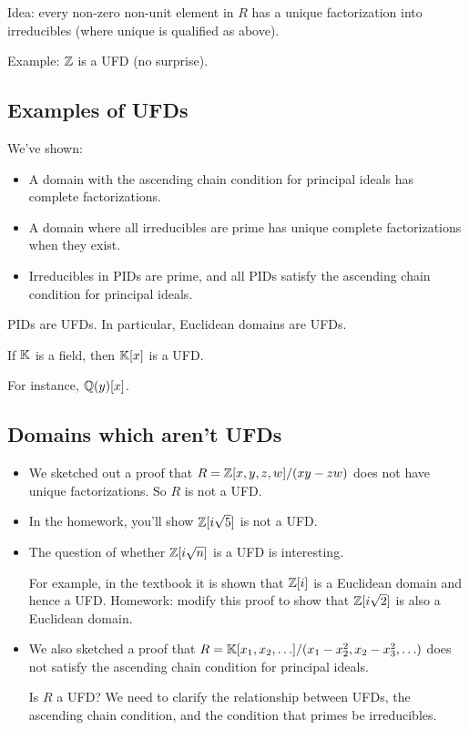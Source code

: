 \documentclass[12pt,letterpaper]{report}
\begin{document}
Idea: every non-zero non-unit element in $R$ has a unique factorization into irreducibles (where
unique is qualified as above).

Example: $\mathbb{Z}$ is a UFD (no surprise).

\pagebreak
\subsection{Examples of UFDs}

We've shown:
\begin{itemize}
  \item A domain with the ascending chain condition for principal ideals has complete
    factorizations.
  \item A domain where all irreducibles are prime has unique complete factorizations when they
    exist.
  \item Irreducibles in PIDs are prime, and all PIDs satisfy the ascending chain condition for
    principal ideals.
\end{itemize}

\begin{cor}{}{}
  PIDs are UFDs.
  In particular, Euclidean domains are UFDs.
\end{cor}

\begin{ex}
  If $\mathbb{K}$ is a field, then $\mathbb{K}[x]$ is a UFD.

  For instance, $\mathbb{Q}(y)[x]$.
\end{ex}

\pagebreak
\subsection{Domains which aren't UFDs}

\begin{itemize}
  \item We sketched out a proof that $R = \mathbb{Z}[x, y, z, w]/(xy - zw)$ does not have unique
    factorizations.
    So $R$ is not a UFD.
  \item In the homework, you'll show $\mathbb{Z}[i\sqrt{5}]$ is not a UFD.
  \item The question of whether $\mathbb{Z}[i\sqrt{n}]$ is a UFD is interesting.

    For example, in the textbook it is shown that $\mathbb{Z}[i]$ is a Euclidean domain and hence a UFD.
    Homework: modify this proof to show that $\mathbb{Z}[i\sqrt{2}]$ is also a Euclidean domain.
  \item We also sketched a proof that $R = \mathbb{K}[x_1, x_2, \ldots]/(x_1 - x_2^2, x_2 - x_3^2, \ldots)$
    does not satisfy the ascending chain condition for principal ideals.

    Is $R$ a UFD?
    We need to clarify the relationship between UFDs, the ascending chain condition, and the
    condition that primes be irreducibles.
\end{itemize}
\end{document}
